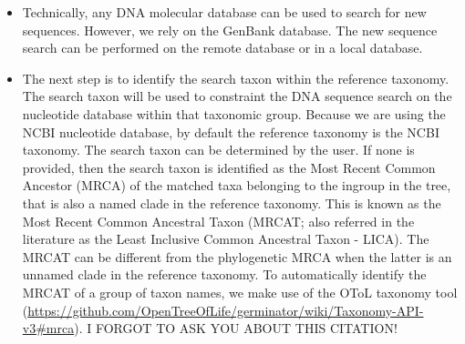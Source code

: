 \documentclass[]{article}
\begin{document}
\begin{itemize}
\item
  Technically, any DNA molecular database can be used to search for new sequences.
  However, we rely on the GenBank database.
  The new sequence search can be performed on the remote database or in a local database.
\item
  The next step is to identify the search taxon within the reference taxonomy. The search taxon will be used to constraint the DNA sequence search on the nucleotide database within that taxonomic group. Because we are using the NCBI nucleotide database, by default the reference taxonomy is the NCBI taxonomy. The search taxon can be determined by the user. If none is provided, then the search taxon is identified as the Most Recent Common Ancestor (MRCA) of the
  matched taxa belonging to the ingroup in the tree, that is also a named clade in the reference taxonomy. This is known as the Most Recent Common
  Ancestral Taxon (MRCAT; also referred in the literature as the Least Inclusive Common Ancestral Taxon - LICA).
  The MRCAT can be different from the phylogenetic MRCA when the latter is an unnamed clade in the reference taxonomy.
  To automatically identify the MRCAT of a group of taxon names, we make use of the OToL taxonomy tool (\url{https://github.com/OpenTreeOfLife/germinator/wiki/Taxonomy-API-v3\#mrca}). I FORGOT TO ASK YOU ABOUT THIS CITATION!


\end{itemize}
\end{document}
